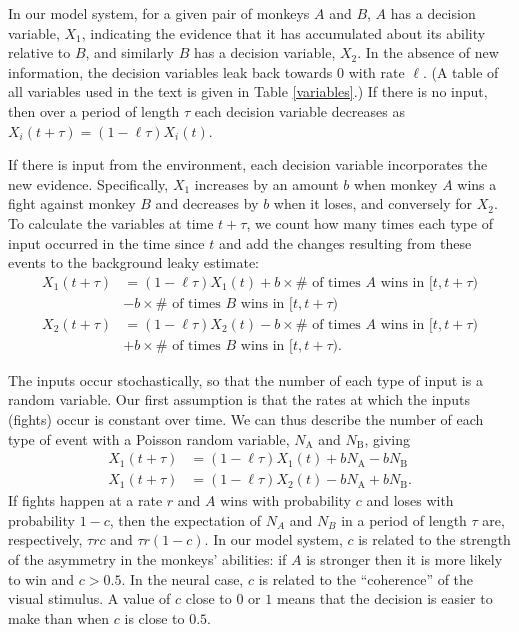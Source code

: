 \documentclass{pnastwo}
\begin{document}
\begin{article}
In our model system, for a given pair of monkeys $A$ and $B$, $A$ has a decision variable, $X_1$, indicating the evidence that it has accumulated about its ability relative to $B$, and similarly $B$ has a decision variable, $X_2$. In the absence of new information, the decision variables leak back towards $0$ with rate $\ell$.  (A table of all variables used in the text is given in Table \ref{variables}.)  If there is no input, then over a period of length $\tau$ each decision variable decreases as $X_i(t+\tau)=(1-\ell\tau)X_i(t)$. 

If there is input from the environment, each decision variable incorporates the new evidence.  Specifically,  $X_1$ increases by an amount $b$ when monkey $A$ wins a fight against monkey $B$ and decreases by $b$ when it loses, and conversely for $X_2$.  To calculate the variables at time $t+\tau$, we  count how many times each type of input occurred in the time since $t$ and add the changes resulting from these events to the background leaky estimate:
\begin{align*}
X_1(t+\tau)&=(1-\ell\tau)X_1(t)+b\times\# \text{ of times $A$  wins in }[t,t+\tau)\\&-b\times\# \text{ of times $B$ wins in }[t,t+\tau)
\\ X_2(t+\tau)&=(1-\ell\tau)X_2(t)-b\times\# \text{ of times $A$ wins in }[t,t+\tau)\\&+b\times\# \text{ of times $B$ wins in }[t,t+\tau). 
\end{align*}

The inputs occur stochastically, so that the number of each type of input is a random variable. Our first assumption is that the rates at which the inputs (fights) occur is constant over time.  We can thus describe the number of each type of event with a Poisson random variable, $N_\text{A}$ and $N_\text{B}$, giving 
\begin{align*}
X_1(t+\tau)&=(1-\ell\tau)X_1(t)+bN_\text{A}-bN_\text{B}
\\ X_1(t+\tau)&=(1-\ell\tau)X_2(t)-bN_\text{A}+bN_\text{B}.
\end{align*}
If fights happen at a rate $r$ and $A$ wins with probability $c$ and loses with probability $1-c$, then the expectation of $N_A$ and $N_B$ in a period of length $\tau$ are, respectively, $\tau r c$ and $\tau r(1-c)$. In our model system, $c$ is related to the strength of the asymmetry in the monkeys' abilities: if $A$ is stronger then it is more likely to win and $c>0.5$. In the neural case, $c$ is related to the ``coherence'' of the visual stimulus.  A value of $c$ close to $0$ or $1$ means that the decision is easier to make than when $c$ is close to $0.5$.


\end{article}
\end{document}

